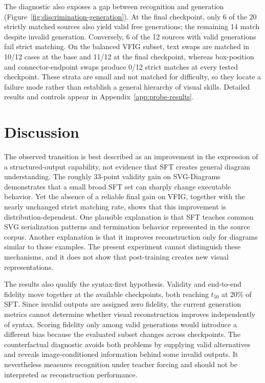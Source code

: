 \documentclass{article}
\begin{document}
The diagnostic also exposes a gap between recognition and generation (Figure~\ref{fig:discrimination-generation}). At the final checkpoint, only 6 of the 20 strictly matched sources also yield valid free generations; the remaining 14 match despite invalid generation. Conversely, 6 of the 12 sources with valid generations fail strict matching. On the balanced VFIG subset, text swaps are matched in 10/12 cases at the base and 11/12 at the final checkpoint, whereas box-position and connector-endpoint swaps produce 0/12 strict matches at every tested checkpoint. These strata are small and not matched for difficulty, so they locate a failure mode rather than establish a general hierarchy of visual skills. Detailed results and controls appear in Appendix~\ref{app:probe-results}.

\section{Discussion}

The observed transition is best described as an improvement in the expression of a structured-output capability, not evidence that SFT creates general diagram understanding. The roughly 33-point validity gain on SVG-Diagrams demonstrates that a small broad SFT set can sharply change executable behavior. Yet the absence of a reliable final gain on VFIG, together with the nearly unchanged strict matching rate, shows that this improvement is distribution-dependent. One plausible explanation is that SFT teaches common SVG serialization patterns and termination behavior represented in the source corpus. Another explanation is that it improves reconstruction only for diagrams similar to those examples. The present experiment cannot distinguish these mechanisms, and it does not show that post-training creates new visual representations.

The results also qualify the syntax-first hypothesis. Validity and end-to-end fidelity move together at the available checkpoints, both reaching $t_{50}$ at 20\% of SFT. Since invalid outputs are assigned zero fidelity, the current generation metrics cannot determine whether visual reconstruction improves independently of syntax. Scoring fidelity only among valid generations would introduce a different bias because the evaluated subset changes across checkpoints. The counterfactual diagnostic avoids both problems by supplying valid alternatives and reveals image-conditioned information behind some invalid outputs. It nevertheless measures recognition under teacher forcing and should not be interpreted as reconstruction performance.
\end{document}
